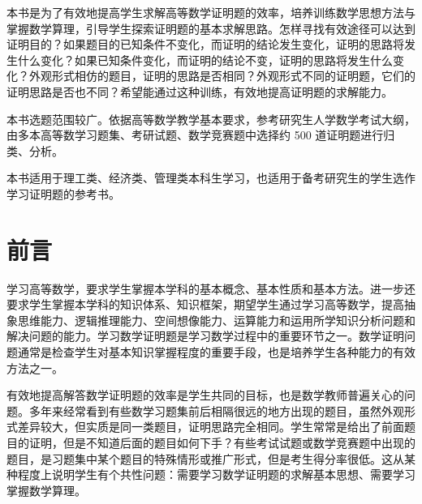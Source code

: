 \begin{jianjie}
  本书是为了有效地提高学生求解高等数学证明题的效率，培养训练数学思想方法与掌握数学算理，引导学生探索证明题的基本求解思路。怎样寻找有效途径可以达到证明目的？如果题目的已知条件不变化，而证明的结论发生变化，证明的思路将发生什么变化？如果已知条件变化，而证明的结论不变，证明的思路将发生什么变化？外观形式相仿的题目，证明的思路是否相同？外观形式不同的证明题，它们的证明思路是否也不同？希望能通过这种训练，有效地提高证明题的求解能力。

  本书选题范围较广。依据高等数学教学基本要求，参考研究生人学数学考试大纲，由多本高等数学习题集、考研试题、数学竞赛题中选择约 500 道证明题进行归类、分析。
  
  本书适用于理工类、经济类、管理类本科生学习，也适用于备考研究生的学生选作学习证明题的参考书。
\end{jianjie}

\chapter{前言}
  学习高等数学，要求学生掌握本学科的基本概念、基本性质和基本方法。进一步还要求学生掌握本学科的知识体系、知识框架，期望学生通过学习高等数学，提高抽象思维能力、逻辑推理能力、空间想像能力、运算能力和运用所学知识分析问题和解决问题的能力。学习数学证明题是学习数学过程中的重要环节之一。数学证明问题通常是检查学生对基本知识掌握程度的重要手段，也是培养学生各种能力的有效方法之一。

  有效地提高解答数学证明题的效率是学生共同的目标，也是数学教师普遍关心的问题。多年来经常看到有些数学习题集前后相隔很远的地方出现的题目，虽然外观形式差异较大，但实质是同一类题目，证明思路完全相同。学生常常是给出了前面题目的证明，但是不知道后面的题目如何下手？有些考试试题或数学竞赛题中出现的题目，是习题集中某个题目的特殊情形或推广形式，但是考生得分率很低。这从某种程度上说明学生有个共性问题：需要学习数学证明题的求解基本思想、需要学习掌握数学算理。

